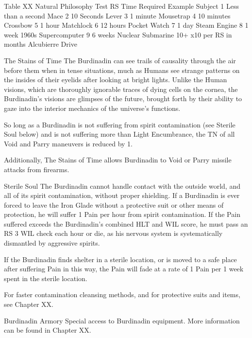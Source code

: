 \documentclass[oneside,11pt,english]{book}
\begin{document}
 
Table XX Natural Philosophy 
Test RS Time Required Example Subject 
1 Less than a second Mace 
2 10 Seconds Lever 
3 1 minute Mousetrap 
4 10 minutes Crossbow 
5 1 hour Matchlock 
6 12 hours Pocket Watch 
7 1 day Steam Engine 
8 1 week 1960s Supercomputer 
9 6 weeks Nuclear Submarine 
10+ x10 per RS in months Alcubierre Drive 


 
The Stains of Time 
The Burdinadin can see trails of causality through the air before them when in tense situations, 
much as Humans see strange patterns on the insides of their eyelids after looking at bright lights. 
Unlike the Human visions, which are thoroughly ignorable traces of dying cells on the cornea, the 
Burdinadin's visions are glimpses of the future, brought forth by their ability to gaze into the 
interior mechanics of the universe's functions. 

 

So long as a Burdinadin is not suffering from spirit contamination (see Sterile Soul below) and is 
not suffering more than Light Encumbrance, the TN of all Void and Parry maneuvers is reduced 
by 1. 

 

Additionally, The Stains of Time allows Burdinadin to Void or Parry missile attacks from 
firearms. 

 

Sterile Soul 
The Burdinadin cannot handle contact with the outside world, and all of its spirit contamination, 
without proper shielding. If a Burdinadin is ever forced to leave the Iron Glade without a 
protective suit or other means of protection, he will suffer 1 Pain per hour from spirit 
contamination. If the Pain suffered exceeds the Burdinadin's combined HLT and WIL score, he 
must pass an RS 3 WIL check each hour or die, as his nervous system is systematically 
dismantled by aggressive spirits. 

 

If the Burdinadin finds shelter in a sterile location, or is moved to a safe place after suffering Pain 
in this way, the Pain will fade at a rate of 1 Pain per 1 week spent in the sterile location. 

 

For faster contamination cleansing methods, and for protective suits and items, see Chapter XX. 

 

Burdinadin Armory 
Special access to Burdinadin equipment. More information can be found in Chapter XX. 
\end{document}
